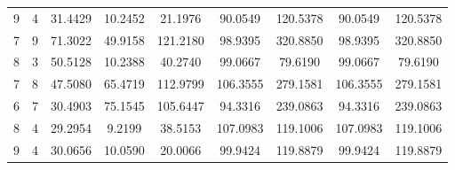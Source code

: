 \documentclass[withoutpreface,bwprint]{cumcmthesis} %
\begin{document}
\begin{appendices}
\begin{table}[htbp!]
\begin{tabular}{@{}ccccccccc@{}}
								9              & 4              & 31.4429     & 10.2452     & 21.1976     & 90.0549         & 120.5378        & 90.0549         & 120.5378        \\
								7              & 9              & 71.3022     & 49.9158     & 121.2180    & 98.9395         & 320.8850        & 98.9395         & 320.8850        \\
								8              & 3              & 50.5128     & 10.2388     & 40.2740     & 99.0667         & 79.6190         & 99.0667         & 79.6190         \\
								7              & 8              & 47.5080     & 65.4719     & 112.9799    & 106.3555        & 279.1581        & 106.3555        & 279.1581        \\
								6              & 7              & 30.4903     & 75.1545     & 105.6447    & 94.3316         & 239.0863        & 94.3316         & 239.0863        \\
								8              & 4              & 29.2954     & 9.2199      & 38.5153     & 107.0983        & 119.1006        & 107.0983        & 119.1006        \\
								9              & 4              & 30.0656     & 10.0590     & 20.0066     & 99.9424         & 119.8879        & 99.9424         & 119.8879        \\ \bottomrule
							\end{tabular}
						\end{table}
							

\end{appendices}
\end{document}
